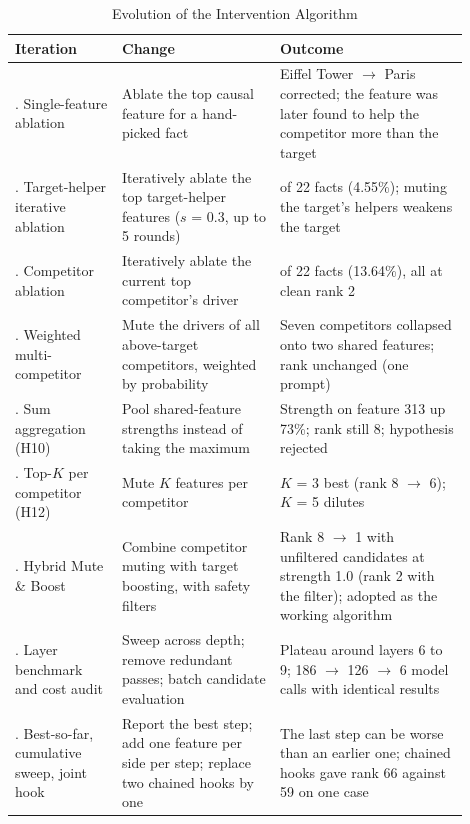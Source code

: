 \documentclass[12pt,a4paper]{report}
\begin{document}
\begin{table}[H]
\centering
\caption{Evolution of the Intervention Algorithm}\label{tab:evolution}
{\small\renewcommand{\arraystretch}{1.15}
\begin{tabular}{|>{\raggedright\arraybackslash}p{0.212\linewidth}|>{\raggedright\arraybackslash}p{0.318\linewidth}|>{\raggedright\arraybackslash}p{0.371\linewidth}|}
\hline
\textbf{Iteration} & \textbf{Change} & \textbf{Outcome} \\ \hline
1. Single-feature ablation & Ablate the top causal feature for a hand-picked fact & Eiffel Tower $\rightarrow$ Paris corrected; the feature was later found to help the competitor more than the target \\ \hline
2. Target-helper iterative ablation & Iteratively ablate the top target-helper features ($s$ = 0.3, up to 5 rounds) & 1 of 22 facts (4.55\%); muting the target's helpers weakens the target \\ \hline
3. Competitor ablation & Iteratively ablate the current top competitor's driver & 3 of 22 facts (13.64\%), all at clean rank 2 \\ \hline
4. Weighted multi-competitor & Mute the drivers of all above-target competitors, weighted by probability & Seven competitors collapsed onto two shared features; rank unchanged (one prompt) \\ \hline
5. Sum aggregation (H10) & Pool shared-feature strengths instead of taking the maximum & Strength on feature 313 up 73\%; rank still 8; hypothesis rejected \\ \hline
6. Top-$K$ per competitor (H12) & Mute $K$ features per competitor & $K$ = 3 best (rank 8 $\rightarrow$ 6); $K$ = 5 dilutes \\ \hline
7. Hybrid Mute \& Boost & Combine competitor muting with target boosting, with safety filters & Rank 8 $\rightarrow$ 1 with unfiltered candidates at strength 1.0 (rank 2 with the filter); adopted as the working algorithm \\ \hline
8. Layer benchmark and cost audit & Sweep across depth; remove redundant passes; batch candidate evaluation & Plateau around layers 6 to 9; 186 $\rightarrow$ 126 $\rightarrow$ 6 model calls with identical results \\ \hline
9. Best-so-far, cumulative sweep, joint hook & Report the best step; add one feature per side per step; replace two chained hooks by one & The last step can be worse than an earlier one; chained hooks gave rank 66 against 59 on one case \\ \hline

\end{tabular}}
\end{table}
\end{document}
